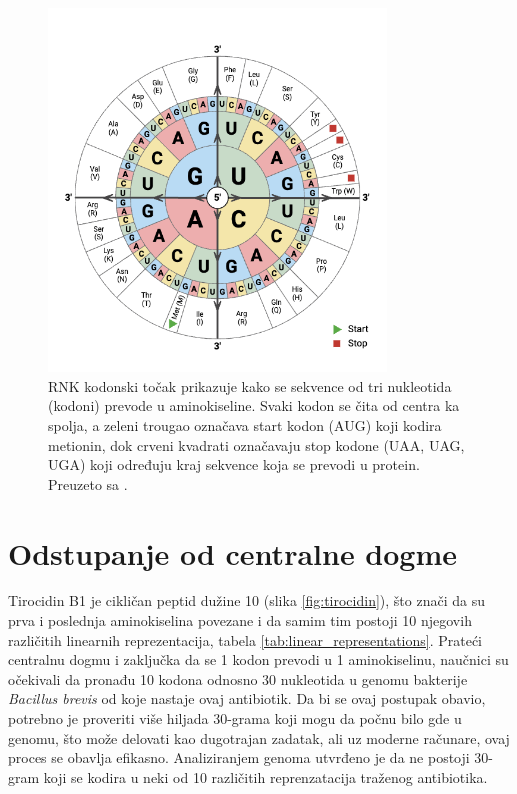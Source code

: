 \documentclass[12pt,oneside]{memoir}
\begin{document}
\begin{figure}[H]
  \centering
  \includegraphics[width=0.8\textwidth]{images/RNA-Codon-Wheel.png}
  \caption{RNK kodonski točak prikazuje kako se sekvence od tri nukleotida (kodoni) prevode u aminokiseline. Svaki kodon se čita od centra ka spolja, a zeleni trougao označava start kodon (AUG) koji kodira metionin, dok crveni kvadrati označavaju stop kodone (UAA, UAG, UGA) koji određuju kraj sekvence koja se prevodi u protein. Preuzeto sa \cite{codon_chart}.}
  \label{fig:codon-wheel}
\end{figure}


\section{Odstupanje od centralne dogme}
Tirocidin B1 je cikličan peptid dužine 10 (slika \ref{fig:tirocidin}), što znači da su prva i poslednja aminokiselina povezane i da samim tim postoji 10 njegovih različitih linearnih reprezentacija, tabela \ref{tab:linear_representations}. Prateći centralnu dogmu i zaključka da se 1 kodon prevodi u 1 aminokiselinu, naučnici su očekivali da pronađu 10 kodona odnosno 30 nukleotida u genomu bakterije \emph{Bacillus brevis} od koje nastaje ovaj antibiotik. Da bi se ovaj postupak obavio, potrebno je proveriti više hiljada 30-grama koji mogu da počnu bilo gde u genomu, što može delovati kao dugotrajan zadatak, ali uz moderne računare, ovaj proces se obavlja efikasno. Analiziranjem genoma utvrđeno je da ne postoji 30-gram koji se kodira u neki od 10 različitih reprenzatacija traženog antibiotika.
\end{document}
